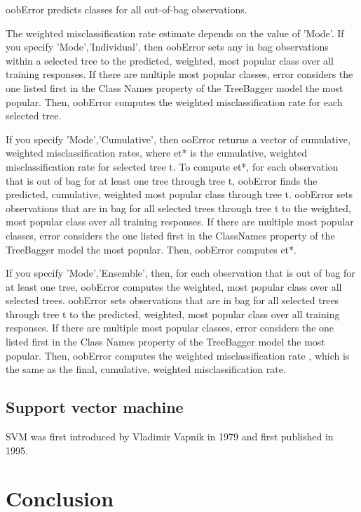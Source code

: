 oobError predicts classes for all out-of-bag observations.

The weighted misclassification rate estimate depends on the value of 'Mode'.
If you specify 'Mode','Individual', then oobError sets any in bag observations within a selected tree to the predicted, weighted, most popular class over all training responses. If there are multiple most popular classes, error considers the one listed first in the Class Names property of the TreeBagger model the most popular. Then, oobError computes the weighted misclassification rate for each selected tree.

If you specify 'Mode','Cumulative', then ooError returns a vector of cumulative, weighted misclassification rates, where et* is the cumulative, weighted misclassification rate for selected tree t. To compute et*, for each observation that is out of bag for at least one tree through tree t, oobError finds the predicted, cumulative, weighted most popular class through tree t. oobError sets observations that are in bag for all selected trees through tree t to the weighted, most popular class over all training responses. If there are multiple most popular classes, error considers the one listed first in the ClassNames property of the TreeBagger model the most popular. Then, oobError computes et*.


If you specify 'Mode','Ensemble', then, for each observation that is out of bag for at least one tree, oobError computes the weighted, most popular class over all selected trees. oobError sets observations that are in bag for all selected trees through tree t to the predicted, weighted, most popular class over all training responses. If there are multiple most popular classes, error considers the one listed first in the Class Names property of the TreeBagger model the most popular. Then, oobError computes the weighted misclassification rate , which is the same as the final, cumulative, weighted misclassification rate.


\subsection{Support vector machine}
SVM was first introduced by Vladimir Vapnik in 1979 and first published in 1995.









\section{Conclusion}

